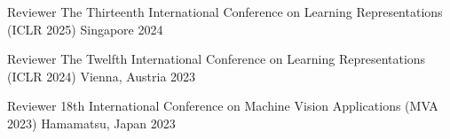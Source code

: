 

\begin{cvhonors}

  \cvhonor
    {Reviewer} %
    {The Thirteenth International Conference on Learning Representations (ICLR 2025)} %
    {Singapore}  %
    {2024} %

  \cvhonor
    {Reviewer} %
    {The Twelfth International Conference on Learning Representations (ICLR 2024)} %
    {Vienna, Austria} %
    {2023} %

  \cvhonor
    {Reviewer} %
    {18th International Conference on Machine Vision Applications (MVA 2023)} %
    {Hamamatsu, Japan} %
    {2023} %


\end{cvhonors}
